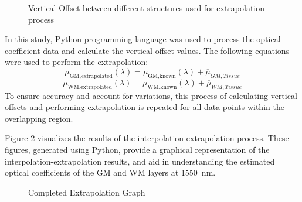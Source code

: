 \documentclass[journal,twoside,web]{ieeecolor}
\begin{document}
\begin{figure}[!htb]
    \caption{\label{fig:Overlap} Vertical Offset between different structures used for extrapolation process}
\end{figure}
In this study, Python programming language was used to process the optical coefficient data and calculate the vertical offset values. 
The following equations were used to perform the extrapolation:
\begin{equation}
    \label{eq:GMextrapolate}
    \mu_{\text{GM,extrapolated}}(\lambda) = \mu_{\text{GM,known}}(\lambda) + \overline{\mu}_{GM, Tissue}
\end{equation}
\begin{equation}
    \label{eq:WMextrapolate}
    \mu_{\text{WM,extrapolated}}(\lambda) = \mu_{\text{WM,known}}(\lambda) + \overline{\mu}_{WM, Tissue}
\end{equation}
To ensure accuracy and account for variations, this process of calculating vertical offsets and performing extrapolation is repeated for 
all data points within the overlapping region.

Figure \ref{fig:Extrapolation} visualizes the results of the interpolation-extrapolation process. These figures, generated using Python, 
provide a graphical representation of the interpolation-extrapolation results, and aid in understanding the estimated optical coefficients of the GM and WM layers at 1550~nm.
\begin{figure}[htb]
    \caption{\label{fig:Extrapolation} Completed Extrapolation Graph}
\end{figure}
\end{document}
